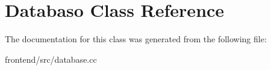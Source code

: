 \hypertarget{classDatabaso}{\section{Databaso Class Reference}
\label{classDatabaso}
}


The documentation for this class was generated from the following file\-:\begin{DoxyCompactItemize}
\item 
frontend/src/database.\-cc\end{DoxyCompactItemize}
